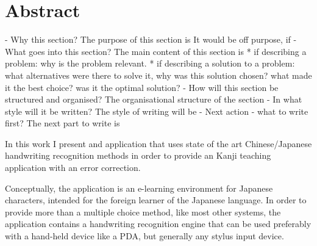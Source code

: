 
\section{Abstract}

- Why this section? 
  The purpose of this section is 
  It would be off purpose, if 
- What goes into this section?
  The main content of this section is 
  * if describing a problem: why is the problem relevant.
  * if describing a solution to a problem: what alternatives were
    there to solve it, why was this solution chosen? 
    what made it the best choice? was it the optimal solution?
- How will this section be structured and organised?
  The organisational structure of the section 
- In what style will it be written?
  The style of writing will be 
- Next action - what to write first?
  The next part to write is

In this work I present and application that uses state of the art 
Chinese/Japanese handwriting recognition methods in order to provide 
an Kanji teaching application with an error correction.

Conceptually, the application is an e-learning environment for Japanese 
characters, intended for the foreign learner of the Japanese language. 
In order to provide more than a  multiple choice method, like most other 
systems, the application contains a handwriting recognition engine that can
be used preferably with a hand-held device like a PDA, but generally any 
stylus input device.

